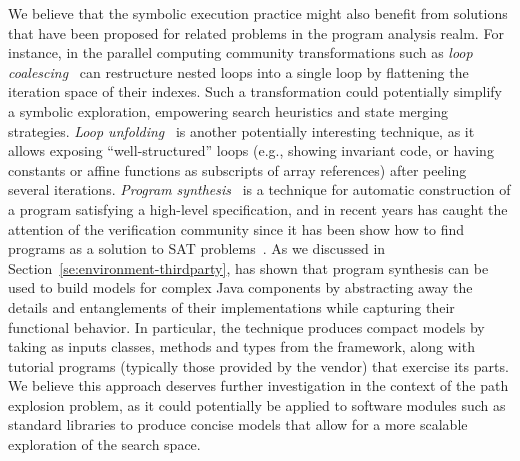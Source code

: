 {
We believe that the symbolic execution practice might also benefit from solutions that have been proposed for related problems in the program analysis realm. For instance, in the parallel computing community transformations such as {\em loop coalescing}~\cite{BGS-CSUR94} can restructure nested loops into a single loop by flattening the iteration space of their indexes. Such a transformation could potentially simplify a symbolic exploration, empowering search heuristics and state merging strategies. {\em Loop unfolding}~\cite{SK-SIGPLAN-NOTICES04} is another potentially interesting technique, as it allows exposing ``well-structured'' loops (e.g., showing invariant code, or having constants or affine functions as subscripts of array references) after peeling several iterations. {\em Program synthesis}~\cite{PR-POPL89} is a technique for automatic construction of a program satisfying a high-level specification, and in recent years has caught the attention of the verification community since it has been show how to find programs as a solution to SAT problems~\cite{Solar-Lezama08}. As we discussed in Section~\ref{se:environment-thirdparty}, \cite{JQF-ICSE16} has shown that program synthesis can be used to build models for complex Java components by abstracting away the details and entanglements of their implementations while capturing their functional behavior. In particular, the technique produces compact models by taking as inputs classes, methods and types from the framework, along with tutorial programs (typically those provided by the vendor) that exercise its parts. We believe this approach deserves further investigation in the context of the path explosion problem, as it could potentially be applied to software modules such as standard libraries to produce concise models that allow for a more scalable exploration of the search space. 
}

